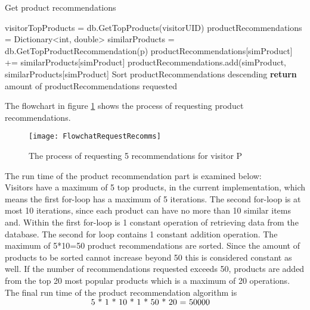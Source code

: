 \begin{algorithm}[H]
\caption{Get product recommendations}
\label{alg:recommendation}
\begin{algorithmic}[1]
\State visitorTopProducts = db.GetTopProducts(visitorUID)
\State productRecommendations = Dictionary<int, double>
\State similarProducts = db.GetTopProductRecommendation(p)
\State productRecommendations[simProduct] += similarProducts[simProduct]
\Else
\State productRecommendations.add(simProduct, similarProducts[simProduct]
\EndIf
\EndFor
\EndFor
\State Sort productRecommendations descending
\State \textbf{return} amount of productRecommendations requested
\State 
\end{algorithmic}
\end{algorithm}

The flowchart in figure \ref{flowchartRecomm} shows the process of requesting product recommendations.

\begin{figure}[H]
\centering
\texttt{[image: FlowchatRequestRecomms]}
\caption{The process of requesting 5 recommendations for visitor P}
\label{flowchartRecomm}
\end{figure}

The run time of the product recommendation part is examined below: \\
Visitors have a maximum of 5 top products, in the current implementation, which means the first for-loop has a maximum of 5 iterations. 
The second for-loop is at most 10 iterations, since each product can have no more than 10 similar items and.
Within the first for-loop is 1 constant operation of retrieving data from the database. The second for loop contains 1 constant addition operation.
The maximum of 5*10=50 product recommendations are sorted. Since the amount of products to be sorted cannot increase beyond 50 this is considered constant as well.
If the number of recommendations requested exceeds 50, products are added from the top 20 most popular products which is a maximum of 20 operations.
The final run time of the product recommendation algorithm is \\

\begin{math}
\centerline{ 5 * 1 * 10 * 1 * 50 * 20 = 50000}
\end{math}\\

